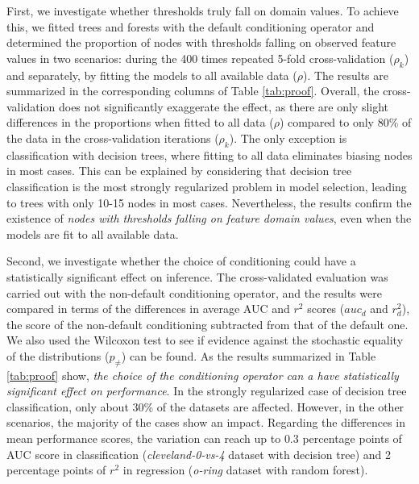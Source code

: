 \documentclass[sn-mathphys]{sn-jnl}%
\theoremstyle{thmstyleone}%
\theoremstyle{thmstyletwo}%
\theoremstyle{thmstylethree}%
\begin{document}
First, we investigate whether thresholds truly fall on domain values. To achieve this, we fitted trees and forests with the default conditioning operator and determined the proportion of nodes with thresholds falling on observed feature values in two scenarios: during the 400 times repeated 5-fold cross-validation ($\rho_k$) and separately, by fitting the models to all available data ($\rho$). The results are summarized in the corresponding columns of Table \ref{tab:proof}. Overall, the cross-validation does not significantly exaggerate the effect, as there are only slight differences in the proportions when fitted to all data ($\rho$) compared to only 80\% of the data in the cross-validation iterations ($\rho_k$). The only exception is classification with decision trees, where fitting to all data eliminates biasing nodes in most cases. This can be explained by considering that decision tree classification is the most strongly regularized problem in model selection, leading to trees with only 10-15 nodes in most cases. Nevertheless, the results confirm the existence of \emph{nodes with thresholds falling on feature domain values}, even when the models are fit to all available data.

Second, we investigate whether the choice of conditioning could have a statistically significant effect on inference. The cross-validated evaluation was carried out with the non-default conditioning operator, and the results were compared in terms of the differences in average AUC and $r^2$ scores ($auc_d$ and $r^2_d$), the score of the non-default conditioning subtracted from that of the default one. We also used the Wilcoxon test to see if evidence against the stochastic equality of the distributions ($p_{\neq}$) can be found. As the results summarized in Table \ref{tab:proof} show, \emph{the choice of the conditioning operator can a have statistically significant effect on performance}. In the strongly regularized case of decision tree classification, only about 30\% of the datasets are affected. However, in the other scenarios, the majority of the cases show an impact. Regarding the differences in mean performance scores, the variation can reach up to $0.3$ percentage points of AUC score in classification (\emph{cleveland-0-vs-4} dataset with decision tree) and 2 percentage points of $r^2$ in regression (\emph{o-ring} dataset with random forest).

\end{document}
